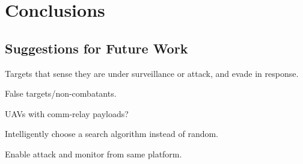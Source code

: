 \chapter{Conclusions}


\section{Suggestions for Future Work}
Targets that sense they are under surveillance or attack, and evade in response.

False targets/non-combatants.

UAVs with comm-relay payloads?

Intelligently choose a search algorithm instead of random.


Enable attack and monitor from same platform.